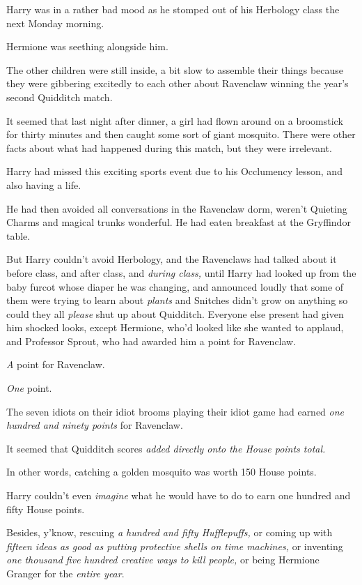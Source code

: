 Harry was in a rather bad mood as he stomped out of his Herbology class
the next Monday morning.

Hermione was seething alongside him.

The other children were still inside, a bit slow to assemble their
things because they were gibbering excitedly to each other about
Ravenclaw winning the year's second Quidditch match.

It seemed that last night after dinner, a girl had flown around on a
broomstick for thirty minutes and then caught some sort of giant
mosquito. There were other facts about what had happened during this
match, but they were irrelevant.

Harry had missed this exciting sports event due to his Occlumency
lesson, and also having a life.

He had then avoided all conversations in the Ravenclaw dorm, weren't
Quieting Charms and magical trunks wonderful. He had eaten breakfast at
the Gryffindor table.

But Harry couldn't avoid Herbology, and the Ravenclaws had talked about
it before class, and after class, and \emph{during class,} until Harry
had looked up from the baby furcot whose diaper he was changing, and
announced loudly that some of them were trying to learn about
\emph{plants} and Snitches didn't grow on anything so could they all
\emph{please} shut up about Quidditch. Everyone else present had given
him shocked looks, except Hermione, who'd looked like she wanted to
applaud, and Professor Sprout, who had awarded him a point for
Ravenclaw.

\emph{A} point for Ravenclaw.

\emph{One} point.

The seven idiots on their idiot brooms playing their idiot game had
earned \emph{one hundred and ninety points} for Ravenclaw.

It seemed that Quidditch scores \emph{added directly onto the House
points total.}

In other words, catching a golden mosquito was worth 150 House points.

Harry couldn't even \emph{imagine} what he would have to do to earn one
hundred and fifty House points.

Besides, y'know, rescuing \emph{a hundred and fifty Hufflepuffs,} or
coming up with \emph{fifteen ideas as good as putting protective shells
on time machines,} or inventing \emph{one thousand five hundred creative
ways to kill people,} or being Hermione Granger for the \emph{entire
year}.

